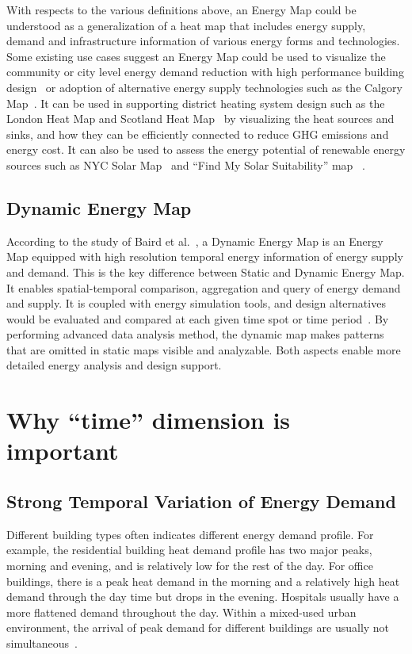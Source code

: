 With respects to the various definitions above, an Energy Map could be
understood as a generalization of a heat map that includes energy
supply, demand and infrastructure information of various energy forms
and technologies. Some existing use cases suggest an Energy Map could
be used to visualize the community or city level energy demand
reduction with high performance building design~\cite{aacip2009} or
adoption of alternative energy supply technologies such as the Calgory
Map~\cite{aacip2009}. It can be used in supporting district heating
system design such as the London Heat Map and Scotland Heat
Map~\cite{decentralHeatMap2011, Finney2012165, scotlandHeatmap} by
visualizing the heat sources and sinks, and how they can be
efficiently connected to reduce GHG emissions and energy cost. It can
also be used to assess the energy potential of renewable energy
sources such as NYC Solar Map~\cite{NYCSolarMap} and ``Find My Solar
Suitability'' map ~\cite{findSolar2015}.

\subsection{Dynamic Energy Map}
According to the study of Baird et al.\ , a Dynamic Energy Map is an
Energy Map equipped with high resolution temporal energy information
of energy supply and demand. This is the key difference between Static
and Dynamic Energy Map. It enables spatial-temporal comparison,
aggregation and query of energy demand and supply. It is coupled with
energy simulation tools, and design alternatives would be evaluated
and compared at each given time spot or time
period~\cite{baird2014}. By performing advanced data analysis method,
the dynamic map makes patterns that are omitted in static maps visible
and analyzable. Both aspects enable more detailed energy analysis and
design support.

\section{Why ``time'' dimension is important}
\subsection{Strong Temporal Variation of Energy Demand}
Different building types often indicates different energy demand
profile. For example, the residential building heat demand profile has
two major peaks, morning and evening, and is relatively low for the
rest of the day. For office buildings, there is a peak heat demand in
the morning and a relatively high heat demand through the day time but
drops in the evening. Hospitals usually have a more flattened demand
throughout the day. Within a mixed-used urban environment, the arrival
of peak demand for different buildings are usually not
simultaneous~\cite{decentralHeatMap2011}.

